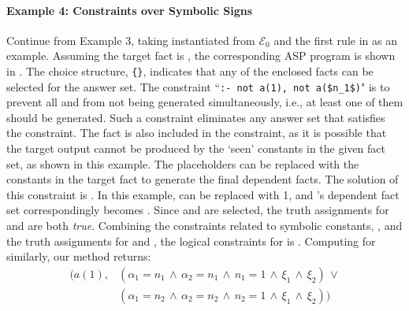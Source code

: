 \paragraph*{\textbf{Example 4: Constraints over Symbolic Signs}} 
Continue from Example 3,
taking 
 instantiated from $\mathcal{E}_0$ and the first rule in  as an example.
Assuming the target fact is , the corresponding ASP program is shown in . 
The choice structure, \lstinline!{}!, indicates that any of the enclosed facts can be selected for the answer set. 
The constraint ``\lstinline[mathescape]{:- not a(1), not a($n_1$)}" is to prevent all  and  from not being generated simultaneously, i.e., at least one of them should be generated.
Such a constraint eliminates any answer set that satisfies the constraint.
The fact  is also included in the constraint, as it is possible that the target output cannot be produced by the `seen' constants in the given fact set, as shown in this example.
The placeholders can be replaced with the constants in the target fact to generate the final dependent facts.
The solution of this constraint is .
In this example,  can be replaced with 1, and 's dependent fact set 
 correspondingly becomes .
Since  and  are selected, the truth assignments for  and  are both \emph{true}. 
Combining the constraints related to symbolic constants, 
, and the truth assignments for  and , the logical constraints for  is 
.
Computing \code{\psi} for  similarly, our method returns:
\begin{align*}
  (a(1), & (\alpha_1 {=} n_1 {\,\wedge\,} \alpha_2{=}n_1 {\,\wedge\,} n_1 {=} 1 {\,\wedge\,} \xi_1 {\,\wedge\,} \xi_2) \,\vee \\
          & (\alpha_1 {=} n_2 {\,\wedge\,} \alpha_2{=}n_2 {\,\wedge\,} n_2 {=} 1 {\,\wedge\,} \xi_1 {\,\wedge\,} \xi_2))
\end{align*}

